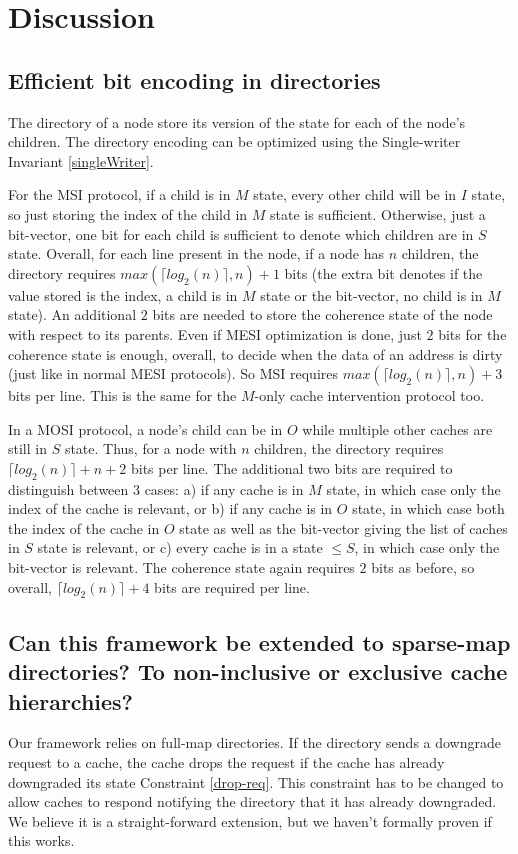 \section{Discussion}
\label{sec:discussion}

\subsection{Efficient bit encoding in directories}
The directory of a node store its version of the state for each of the node's
children. The directory encoding can be optimized using the Single-writer
Invariant \ref{singleWriter}.

For the MSI protocol, if a child is in $M$ state, every other child will be in
$I$ state, so just storing the index of the child in $M$ state is sufficient.
Otherwise, just a bit-vector, one bit for each child is sufficient to denote
which children are in $S$ state. Overall, for each line present in the node,
if a node has $n$ children, the directory requires $max(\lceil log_2(n)\rceil, n)
+ 1$ bits (the extra bit denotes if the value stored is the index, \ie a child
is in $M$ state or the bit-vector, \ie no child is in $M$ state). An additional
$2$ bits are needed to store the coherence state of the node with respect to its
parents. Even if MESI optimization is done, just $2$ bits for the coherence
state is enough, overall, to decide when the data of an address is dirty (just
like in normal MESI protocols). So MSI requires $max(\lceil log_2(n)\rceil, n)
+ 3$ bits per line. This is the same for the $M$-only cache intervention
protocol too.

In a MOSI protocol, a node's child can be in $O$ while multiple other caches are
still in $S$ state. Thus, for a node with $n$ children, the directory requires
$\lceil log_2(n)\rceil + n + 2$ bits per line. The additional two bits are
required to distinguish between 3 cases: a) if any cache is in $M$ state, in
which case only the index of the cache is relevant, or b) if any cache is in $O$
state, in which case both the index of the cache in $O$ state as well as the
bit-vector giving the list of caches in $S$ state is relevant, or c) every cache
is in a state $\le S$, in which case only the bit-vector is relevant. The
coherence state again requires $2$ bits as before, so overall, $\lceil log_2(n)
\rceil + 4$ bits are required per line.

\subsection{Can this framework be extended to sparse-map directories? To
non-inclusive or exclusive cache hierarchies?}
Our framework relies on full-map directories. If the directory sends a downgrade
request to a cache, the cache drops the request if the cache has already
downgraded its state Constraint \ref{drop-req}. This constraint has to be
changed to allow caches to respond notifying the directory that it has already
downgraded. We believe it is a straight-forward extension, but we haven't
formally proven if this works.

